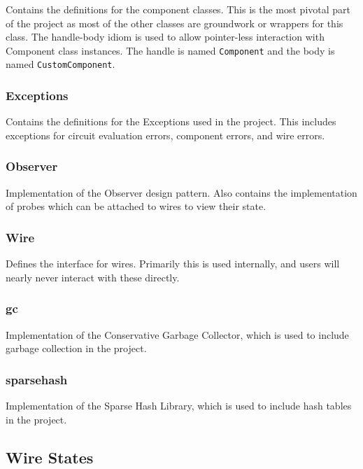\documentclass{article}
\newcommand{\ClassName}[1]{\texttt{#1}}
\begin{document}
Contains the definitions for the component classes. This is the most pivotal part of the project as most of the other classes are groundwork or wrappers for this class. The handle-body idiom is used to allow pointer-less interaction with Component class instances. The handle is named \ClassName{Component} and the body is named \ClassName{CustomComponent}.

\subsubsection{Exceptions}

Contains the definitions for the Exceptions used in the project. This includes exceptions for circuit evaluation errors, component errors, and wire errors.

\subsubsection{Observer}

Implementation of the Observer design pattern. Also contains the implementation of probes which can be attached to wires to view their state.

\subsubsection{Wire}

Defines the interface for wires. Primarily this is used internally, and users will nearly never interact with these directly.

\subsubsection{gc}

Implementation of the Conservative Garbage Collector, which is used to include garbage collection in the project.\cite{Boehm-1993}

\subsubsection{sparsehash}

Implementation of the Sparse Hash Library, which is used to include hash tables in the project.\cite{sparsehash}

\subsection{Wire States}
\end{document}
